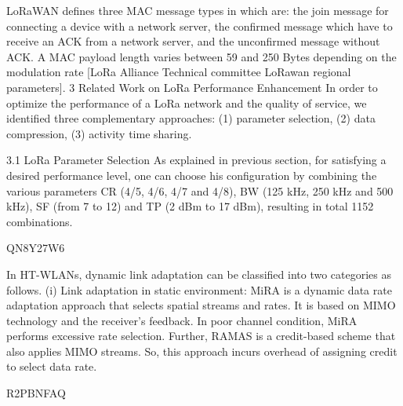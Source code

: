 LoRaWAN defines three MAC message types in \cite{LorawanSpecification} which are:
the join message for connecting a device with a network server,
	the confirmed message which have to receive an ACK from a network server,
	and the unconfirmed message without ACK.
A MAC payload length varies between 59 and 250 Bytes depending on the modulation rate [LoRa Alliance Technical committee LoRawan regional parameters].
3 Related Work on LoRa Performance Enhancement In order to optimize the performance of a LoRa network and the quality of service,
	we identified three complementary approaches:
	(1) parameter selection,
	(2) data compression,
	(3) activity time sharing.


3.1 LoRa Parameter Selection As explained in previous section,
	for satisfying a desired performance level,
	one can choose his configuration by combining the various parameters CR (4/5, 4/6, 4/7 and 4/8),
	BW (125 kHz, 250 kHz and 500 kHz),
	SF (from 7 to 12) and TP (2 dBm to 17 dBm),
	resulting in total 1152 combinations.






\cite{karmakar_linkcon_2017} QN8Y27W6

In HT-WLANs,
	dynamic link adaptation can be classified into two categories as follows.
(i) Link adaptation in static environment:
	MiRA \cite{pefkianakis_window-based_2013} is a dynamic data rate adaptation approach that selects spatial streams and rates.
It is based on MIMO technology and the receiver’s feedback.
In poor channel condition,
	MiRA performs excessive rate selection.
Further,
	RAMAS \cite{nguyen_practical_2011} is a credit-based scheme that also applies MIMO streams.
So,
	this approach incurs overhead of assigning credit to select data rate.



\cite{bor_lora_2017} R2PBNFAQ

